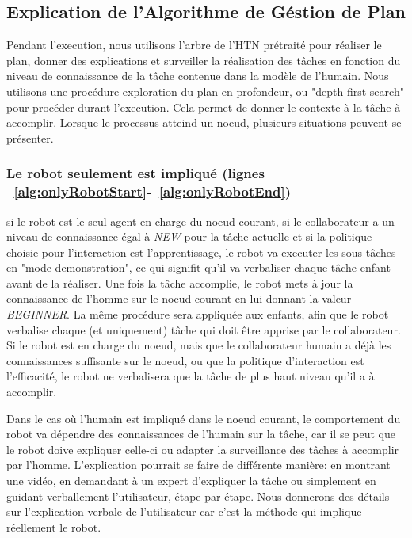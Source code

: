 \documentclass[a4paper,11pt,twoside]{StyleThese}
\begin{document}
\subsection{Explication de l'Algorithme de Géstion de Plan}
Pendant l'execution, nous utilisons l'arbre de l'HTN prétraité pour réaliser le plan, donner des explications et surveiller la réalisation des tâches en fonction du niveau de connaissance de la tâche contenue dans la modèle de l'humain.
Nous utilisons une procédure exploration du plan en profondeur, ou "depth first search" pour procéder durant l'execution. Cela permet de donner le contexte à la tâche à accomplir.
Lorsque le processus atteind un noeud, plusieurs situations peuvent se présenter.

\subsubsection{Le robot seulement est impliqué (lignes ~\ref{alg:onlyRobotStart}-~\ref{alg:onlyRobotEnd})} si le robot est le seul agent en charge du noeud courant, si le collaborateur a un niveau de connaissance égal à \textit{NEW} pour la tâche actuelle et si la politique choisie pour l'interaction est l'apprentissage, le robot va executer les sous tâches en "mode demonstration", ce qui signifit qu'il va verbaliser chaque tâche-enfant avant de la réaliser. Une fois la tâche accomplie, le robot mets à jour la connaissance de l'homme sur le noeud courant en lui donnant la valeur \textit{BEGINNER}. La même procédure sera appliquée aux enfants, afin que le robot verbalise chaque (et uniquement) tâche qui doit être apprise par le collaborateur.
Si le robot est en charge du noeud, mais que le collaborateur humain a déjà les connaissances suffisante sur le noeud, ou que la politique d'interaction est l'efficacité, le robot ne verbalisera que la tâche de plus haut niveau qu'il a à accomplir.

Dans le cas où l'humain est impliqué dans le noeud courant, le comportement du robot va dépendre des connaissances de l'humain sur la tâche, car il se peut que le robot doive expliquer celle-ci ou adapter la surveillance des tâches à accomplir par l'homme.
L'explication pourrait se faire de différente manière: en montrant une vidéo, en demandant à un expert d'expliquer la tâche ou simplement en guidant verballement l'utilisateur, étape par étape. Nous donnerons des détails sur l'explication verbale de l'utilisateur car c'est la méthode qui implique réellement le robot.
\end{document}
